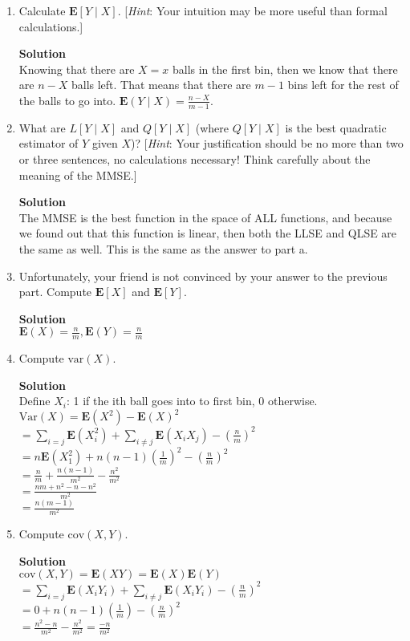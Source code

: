\documentclass[11pt]{article}
\newenvironment{Parts}{\begin{enumerate}[label=(\alph*)]}{\end{enumerate}}
\newcommand*{\Part}{\item}
\newenvironment{Answer}{\vspace{10pt}\begin{mdframed}\textbf{Solution}\\}{\end{mdframed}\vfill\pagebreak[3]}
\newenvironment{Answer}{\vspace{10pt}}{\vfill\pagebreak[3]}
\newcommand*{\E}{\textbf{E}}
\newcommand*{\Var}[1]{\text{Var}(#1)}
\newcommand*{\var}[1]{\text{var}(#1)}
\newcommand*{\cov}[1]{\text{cov}(#1)}
\begin{document}
\begin{Parts}
  \Part Calculate $\E[Y \mid X]$. [\textit{Hint}: Your intuition may be more useful than formal calculations.]
  \begin{Answer}
Knowing that there are $X=x$ balls in the first bin, then we know that there are $n-X$ balls left. That means that there are $m-1$ bins left for the rest of the balls to go into. $\E(Y \mid X)=\frac{n-X}{m-1}$.
  \end{Answer}
  
  \Part What are $L[Y \mid X]$ and $Q[Y \mid X]$ (where $Q[Y \mid X]$ is the best quadratic estimator of $Y$ given $X$)? [\textit{Hint}: Your justification should be no more than two or three sentences, no calculations necessary! Think carefully about the meaning of the MMSE.]
  \begin{Answer}
The MMSE is the best function in the space of ALL functions, and because we found out that this function is linear, then both the LLSE and QLSE are the same as well. This is the same as the answer to part a.
  \end{Answer}
  
  \Part Unfortunately, your friend is not convinced by your answer to the previous part. Compute $\E[X]$ and $\E[Y]$.
  \begin{Answer}
$\E(X)=\frac{n}{m},\E(Y)=\frac{n}{m}$
  \end{Answer}

  \Part Compute $\var{X}$.
  \begin{Answer}
Define $X_i$: 1 if the ith ball goes into to first bin, 0 otherwise.\\
$\Var{X}=\E(X^2)-\E(X)^2$\\
$=\sum_{i=j}\E(X_i^2)+\sum_{i \neq j}\E(X_iX_j)-(\frac{n}{m})^2$\\
$=n\E(X_1^2)+n(n-1)(\frac{1}{m})^2-(\frac{n}{m})^2$\\
$=\frac{n}{m}+\frac{n(n-1)}{m^2}-\frac{n^2}{m^2}$\\
$=\frac{nm+n^2-n-n^2}{m^2}$\\
$=\frac{n(m-1)}{m^2}$
  \end{Answer}
  
  \Part Compute $\cov{X, Y}$.
  \begin{Answer}
$\cov{X,Y}=\E(XY)=\E(X)\E(Y)$\\
$=\sum_{i=j}\E(X_iY_i)+\sum_{i \neq j}\E(X_iY_i)-(\frac{n}{m})^2$\\
$=0+n(n-1)(\frac{1}{m})-(\frac{n}{m})^2$\\
$=\frac{n^2-n}{m^2}-\frac{n^2}{m^2}=\frac{-n}{m^2}$
  \end{Answer}
  

\end{Parts}
\end{document}
